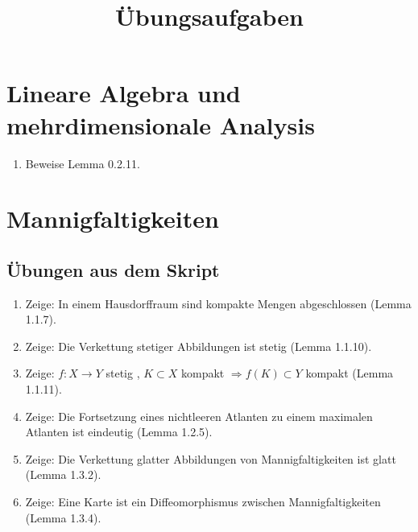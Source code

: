 \documentclass[a4paper]{scrartcl}
\title{Übungsaufgaben}
\begin{document}
	\maketitle
\setcounter{section}{-1}
	\section{Lineare Algebra und mehrdimensionale Analysis}
	\begin{enumerate}
		\item Beweise Lemma 0.2.11.
	\end{enumerate}

	\section{Mannigfaltigkeiten}
	\subsection{Übungen aus dem Skript}
	\begin{enumerate}
		\item Zeige: In einem Hausdorffraum sind kompakte Mengen abgeschlossen (Lemma 1.1.7).
		\item Zeige: Die Verkettung stetiger Abbildungen ist stetig (Lemma 1.1.10).
		\item Zeige: $f\colon X\rightarrow Y$ stetig , $K\subset X$ kompakt $\Rightarrow f(K)\subset Y$ kompakt (Lemma 1.1.11).
		\item Zeige: Die Fortsetzung eines nichtleeren Atlanten zu einem maximalen Atlanten ist eindeutig (Lemma 1.2.5).
		\item Zeige: Die Verkettung glatter Abbildungen von Mannigfaltigkeiten ist glatt (Lemma 1.3.2).
		\item Zeige: Eine Karte ist ein Diffeomorphismus zwischen Mannigfaltigkeiten (Lemma 1.3.4).
	\end{enumerate}
\end{document}
